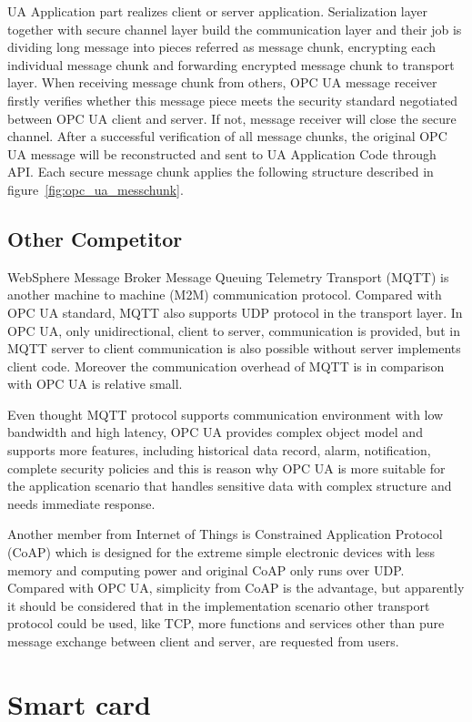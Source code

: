 UA Application part realizes client or server application. Serialization layer together with secure channel layer build the communication layer and their job is dividing long message into pieces referred as message chunk, encrypting each individual message chunk and forwarding encrypted message chunk to transport layer. When receiving message chunk from others, OPC UA message receiver firstly verifies whether this message piece meets the security standard negotiated between OPC UA client and server. If not, message receiver will close the secure channel. After a successful verification of all message chunks, the original OPC UA message will be reconstructed and sent to UA Application Code through API. Each secure message chunk applies the following structure described in figure~\ref{fig:opc_ua_messchunk}.

\subsection{Other Competitor}
WebSphere Message Broker Message Queuing Telemetry Transport (MQTT)\cite{Ref3} is another machine to machine (M2M) communication protocol. Compared with OPC UA standard, MQTT also supports UDP protocol in the transport layer. In OPC UA, only unidirectional, client to server, communication is provided, but in MQTT server to client communication is also possible without server implements client code. Moreover the communication overhead of MQTT is in comparison with OPC UA is relative small. 


Even thought MQTT protocol supports communication environment with low bandwidth and high latency, OPC UA provides complex object model and supports more features, including historical data record, alarm, notification, complete security policies and this is reason why OPC UA is more suitable for the application scenario that handles sensitive data with complex structure and needs immediate response.


Another member from Internet of Things is Constrained Application Protocol (CoAP)\cite{Ref5} which is designed for the extreme simple electronic devices with less memory and computing power and original CoAP only runs over UDP. Compared with OPC UA, simplicity from CoAP is the advantage, but apparently it should be considered that in the implementation scenario other transport protocol could be used, like TCP, more functions and services other than pure message exchange between client and server, are requested from users.

\section{Smart card}
